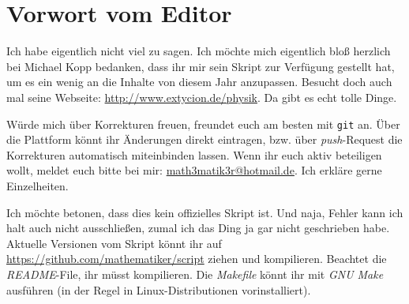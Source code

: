 \chapter{Vorwort vom Editor}

Ich habe eigentlich nicht viel zu sagen.  Ich möchte mich eigentlich
bloß herzlich bei Michael Kopp bedanken, dass ihr mir sein Skript zur
Verfügung gestellt hat, um es ein wenig an die Inhalte von diesem Jahr
anzupassen. Besucht doch auch mal seine Webseite:
\url{http://www.extycion.de/physik}.  Da gibt es echt tolle Dinge.

Würde mich über Korrekturen freuen,  freundet euch am besten mit
\texttt{git} an. Über die Plattform könnt ihr Änderungen direkt
eintragen,  bzw. über \emph{push}-Request die Korrekturen automatisch
miteinbinden lassen.  Wenn ihr euch aktiv beteiligen wollt,  meldet
euch bitte bei mir: \href{mailto:math3matik3r@hotmail.de}{math3matik3r@hotmail.de}.
Ich erkläre gerne Einzelheiten.

Ich möchte betonen, dass dies kein offizielles Skript ist.  Und naja,
Fehler kann ich halt auch nicht ausschließen, zumal ich das Ding ja
gar nicht geschrieben habe. Aktuelle Versionen vom Skript könnt ihr
auf \url{https://github.com/mathematiker/script} ziehen und
kompilieren.  Beachtet die \emph{README}-File, ihr müsst  kompilieren.  Die \emph{Makefile}
könnt ihr mit \emph{GNU Make} ausführen (in der Regel in
Linux-Distributionen vorinstalliert).
